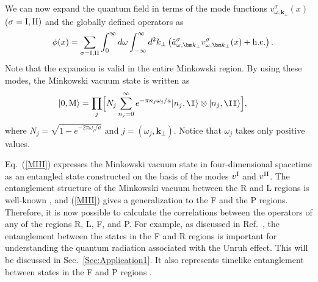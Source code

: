 \documentclass[aps,prd,preprintnumbers,nofootinbib,showpacs]{revtex4}%
\begin{document}
\begin{widetext}
We can now expand the quantum field in terms of the mode functions 
$v^\sigma_{\omega,\bm k_\perp}(x)$ ($\sigma = {\rm I, II})$ and the globally defined operators as
\begin{eqnarray}
&&\phi(x)=\sum_{\sigma={\rm I,II}}\int_0^\infty d\omega\int_{-\infty}^\infty d^2 k_\perp 
\left(
\hat a^\sigma_{\omega,\bm k_\perp}v^\sigma_{\omega,\bm k_\perp}(x)+{\rm h.c.}
\right) .
\label{mode-I-II}
\end{eqnarray}
Note that the expansion is valid in the entire Minkowski region. 
By using these modes, 
the Minkowski vacuum state is written as 
\begin{eqnarray}
\hspace{-5mm}
  |0,{\rm M}\rangle=\prod_j\Bigl[
N_j\sum_{n_j=0}^\infty e^{-\pi n_j \omega_j/a }|n_j,{\I}\rangle \otimes|n_j,{\II}\rangle
\Bigr]  ,
\label{MIII}
\end{eqnarray}
where $N_j=\sqrt{1-e^{-2\pi \omega_j /a}}$ and  $j=(\omega_j,\bm k_\perp)$. 
Notice that $\omega_j$ takes only positive values.


Eq.~(\ref{MIII}) expresses the Minkowski vacuum state in four-dimensional spacetime
as an entangled state constructed on the basis of the modes $v^{\rm I}$ and $v^{\rm II}$. 
The entanglement structure of the Minkowski vacuum between the R 
and L regions is well-known \cite{Unruh,UnruhWald}, and 
(\ref{MIII}) gives a generalization to the F and the P regions. 
Therefore, it is now possible to calculate the correlations between the operators of any of the regions 
R, L, F, and P.
For example, as discussed in Ref.~\cite{ITUY}, the entanglement between the states in the F
and R regions is important for understanding the quantum radiation associated with the Unruh effect.
This will be discussed in Sec.~\ref{Sec:Application1}.
It also represents timelike entanglement between states
in the F and P regions \cite{OlsonRalph}. 



\end{widetext}
\end{document}

